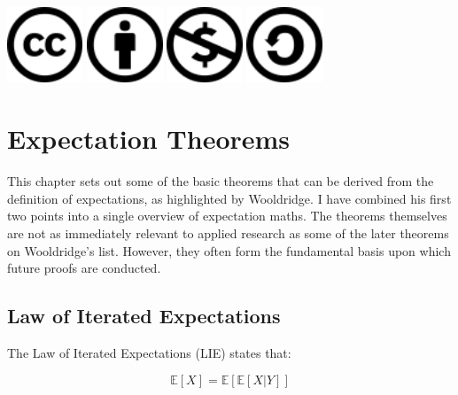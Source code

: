 \documentclass[
]{book}
\begin{document}
\includegraphics[width=0.89in]{images/cc}
\includegraphics[width=0.89in]{images/by}
\includegraphics[width=0.89in]{images/nc}
\includegraphics[width=0.89in]{images/sa}

\hypertarget{exp_theorems}{%
\chapter{Expectation Theorems}\label{exp_theorems}}

This chapter sets out some of the basic theorems that can be derived from the definition of expectations, as highlighted by Wooldridge. I have combined his first two points into a single overview of expectation maths. The theorems themselves are not as immediately relevant to applied research as some of the later theorems on Wooldridge's list. However, they often form the fundamental basis upon which future proofs are conducted.

\hypertarget{law-of-iterated-expectations}{%
\section{Law of Iterated Expectations}\label{law-of-iterated-expectations}}

The Law of Iterated Expectations (LIE) states that:

\begin{equation}
    \mathbb{E}[X] = \mathbb{E}[\mathbb{E}[X|Y]]
\end{equation}
\end{document}
